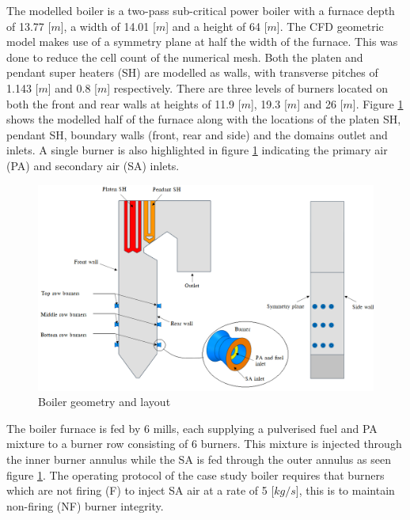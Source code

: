 \documentclass[review]{elsarticle}
\begin{document}
The modelled  boiler is a two-pass sub-critical power boiler with a furnace depth of 13.77 [$m$], a width of 14.01 [$m$] and a height of 64 [$m$]. The CFD geometric model makes use of a symmetry plane  at half the width of the furnace. This was done to reduce the cell count of the numerical mesh. Both the platen and pendant super heaters (SH) are modelled as walls, with transverse pitches of 1.143 [$m$] and 0.8 [$m$] respectively. There are three levels of burners located on both the front and rear walls at heights of 11.9 [$m$], 19.3 [$m$] and 26 [$m$]. Figure \ref{fig_geometry} shows the modelled half of the furnace along with the locations of the platen SH, pendant SH, boundary walls (front, rear and side) and the domains outlet and inlets. A single burner is also highlighted in figure \ref{fig_geometry} indicating the primary air (PA) and secondary air (SA) inlets. \\
\begin{figure} [h!]
\centering
\includegraphics[scale=0.5]{GEOMETRY}
\caption{Boiler geometry and layout}
\label{fig_geometry}
\end{figure}

The boiler furnace is fed by 6 mills, each supplying a pulverised fuel and PA mixture to a burner row consisting of 6 burners. This mixture is injected through the inner burner annulus while the SA is fed through the outer annulus as seen figure \ref{fig_geometry}. The operating protocol of the case study boiler requires that burners which are not firing (F) to inject SA air at a rate of 5 [$kg/s$], this is to maintain non-firing (NF) burner integrity. 
\end{document}

